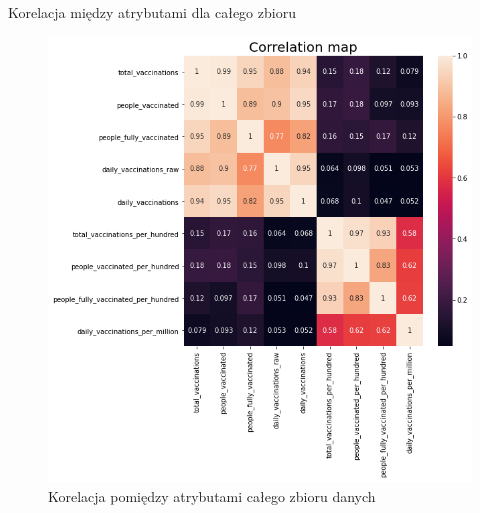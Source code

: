 \documentclass[11pt]{beamer}
\begin{document}
\begin{frame}{Korelacja między atrybutami dla całego zbioru}
\begin{figure}
\centering
\includegraphics[scale=0.4]{../img/corelation.png} 
\caption{Korelacja pomiędzy atrybutami całego zbioru danych\label{Rys:corrHeatMapWorld}}
\end{figure}
\end{frame}

\end{document}
